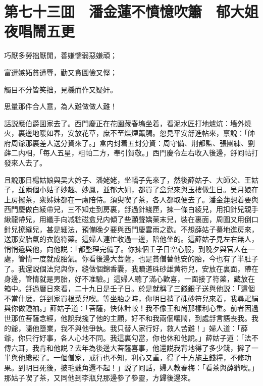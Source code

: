 
\chapter*{第七十三囬　潘金蓮不憤憶吹簫　郁大姐夜唱鬧五更}

巧厭多勞拙厭閒，善嫌懦弱惡嫌頑；

富遭嫉妬貧遭辱，勤又貪圖儉又慳；

觸目不分皆笑拙，見機而作又疑奸。

思量那件合人意，為人難做做人難！

話説應伯爵囬家去了。西門慶正在花園藏春塢坐着，看泥水匠打地爐炕：墻外燒火，裏邊地暖如春，安放花草，庶不至煤煙薰觸。忽見平安㧱進帖來，禀說：「帥府周爺那裏差人送分資來了。」盒内封着五封分資：周守備、荆都監、張團練、劉薛二内相，「每人五星，粗帕二方，奉引賀敬。」西門慶令左右收入後邊，㧱囘帖打發來人去了。

且說那日楊姑娘與吴大妗子、潘姥姥，坐轎子先來了，然後薛姑子、大師父、王姑子，並兩個小姑子妙趣、妙鳳，並郁大姐，都買了盒兒來與玉樓做生日。吴月娘在上房擺茶，衆姊妹都在一䖏陪侍。須臾喫了茶，各人都取便去了。潘金蓮想着要與西門慶做白綾帶兒，三不知走到房裏，㧱過針綫匣，揀一條白綾兒，用扣針兒親手䋺龍帶兒，用纖手向减粧磁盒兒内傾了些顫聲嬌薬末兒，裝在裏面，周圍又用倒口針兒撩縫兒，甚是細法，預備晚夕要與西門慶雲雨之歡。不想薛姑子驀地進房來，送那安胎氣的衣胞符薬。這婦人連忙收過一邊，陪他坐的。這薛姑子見左右無人，悄悄遞與他，向他説：「都整理完備了。你揀個壬子日空心服，到晚夕與官人在一處，管情一度就成胎氣。你看後邊大菩薩，也是貧僧替他安的胎，今也有了半肚子了。我還説個法兒與你，縫做個錦香囊，我贖道硃砂雄黄符兒，安放在裏面，帶在身邊，管情就是男胎，好不准驗。」這婦人聽了滿心歡喜，一面接了符薬，藏放在箱中。㧱過曆日來看，二十九日是壬子日。於是就稱了三錢銀子送與他説：「這個不當什麽，㧱到家買根菜兒喫。等坐胎之時，你明日捎了硃砂符兒來着，我尋疋絹與你做鍾袖。」薛姑子道：「菩薩，快休計較！我不像王和尚那樣利心重。前者因過世那位菩薩念經，他說我攙了他的主顧，好不和我兩個嚷鬧，到處㧱言語丧我。我的爺，隨他墮業，我不與他爭執。我只替人家行好，救人苦難！」婦人道：「薛爺，你只行好事，各人心地不同。我這裏勾當，你也休和他說。」薛姑子道：「法不傳六耳，我肯和他説？去年為後邊大菩薩喜事，他還説我背地得了多少錢，擗了一半與他纔罷了。一個僧家，戒行也不知，利心又重，得了十方施主錢糧，不修功果。到明日死後，披毛戴角還不起！」説了囘話，婦人教春梅：「看茶與薛爺喫。」那姑子喫了茶，又同他到李瓶兒那邊參了參靈，方歸後邊來。

